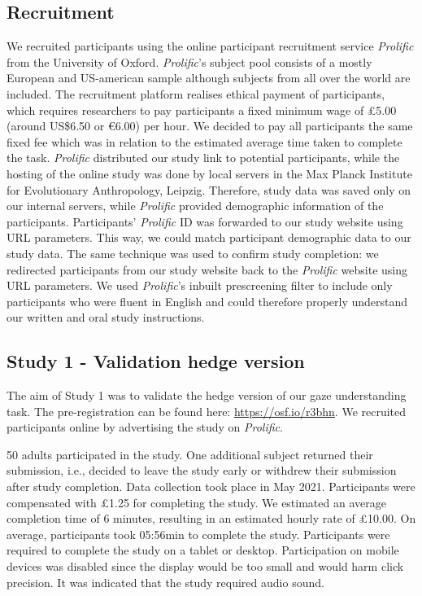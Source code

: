 \documentclass[
  man,floatsintext]{apa6}
\begin{document}
\hypertarget{recruitment}{%
\subsection{Recruitment}\label{recruitment}}

We recruited participants using the online participant recruitment service \emph{Prolific} from the University of Oxford.
\emph{Prolific}'s subject pool consists of a mostly European and US-american sample although subjects from all over the world are included.
The recruitment platform realises ethical payment of participants, which requires researchers to pay participants a fixed minimum wage of £5.00 (around US\$6.50 or €6.00) per hour.
We decided to pay all participants the same fixed fee which was in relation to the estimated average time taken to complete the task.
\emph{Prolific} distributed our study link to potential participants, while the hosting of the online study was done by local servers in the Max Planck Institute for Evolutionary Anthropology, Leipzig.
Therefore, study data was saved only on our internal servers, while \emph{Prolific} provided demographic information of the participants.
Participants' \emph{Prolific} ID was forwarded to our study website using URL parameters.
This way, we could match participant demographic data to our study data.
The same technique was used to confirm study completion: we redirected participants from our study website back to the \emph{Prolific} website using URL parameters.
We used \emph{Prolific}'s inbuilt prescreening filter to include only participants who were fluent in English and could therefore properly understand our written and oral study instructions.

\hypertarget{study-1---validation-hedge-version}{%
\subsection{Study 1 - Validation hedge version}\label{study-1---validation-hedge-version}}

The aim of Study 1 was to validate the hedge version of our gaze understanding task.
The pre-registration can be found here: \url{https://osf.io/r3bhn}.
We recruited participants online by advertising the study on \emph{Prolific}.

50 adults participated in the study.
One additional subject returned their submission, i.e., decided to leave the study early or withdrew their submission after study completion.
Data collection took place in May 2021.
Participants were compensated with £1.25 for completing the study.
We estimated an average completion time of 6 minutes, resulting in an estimated hourly rate of £10.00.
On average, participants took 05:56min to complete the study.
Participants were required to complete the study on a tablet or desktop.
Participation on mobile devices was disabled since the display would be too small and would harm click precision.
It was indicated that the study required audio sound.
\end{document}
